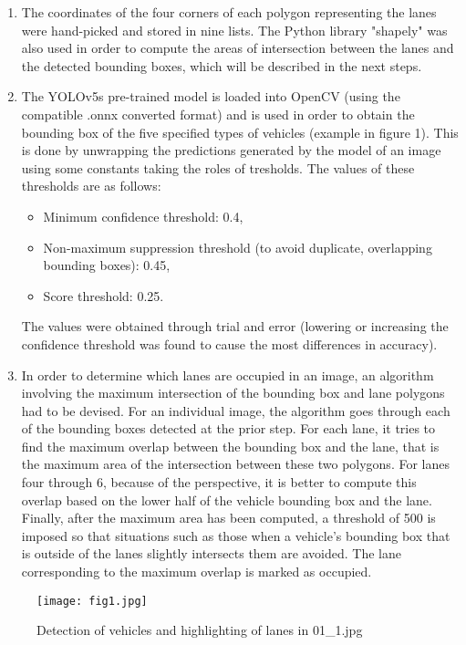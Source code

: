 \documentclass{article}
\begin{document}
\begin{enumerate}
	\item The coordinates of the four corners of each polygon representing the lanes were hand-picked and stored in nine lists. The Python library "shapely"\cite{shapely} was also used in order to compute the areas of intersection between the lanes and the detected bounding boxes, which will be described in the next steps.
	\item The YOLOv5s pre-trained model is loaded into OpenCV (using the compatible .onnx converted format) and is used in order to obtain the bounding box of the five specified types of vehicles (example in figure 1). This is done by unwrapping the predictions generated by the model of an image using some constants taking the roles of tresholds. The values of these thresholds are as follows: 
		\begin{itemize}
			\item Minimum confidence threshold: 0.4,
			\item Non-maximum suppression threshold (to avoid duplicate, overlapping bounding boxes): 0.45,
			\item Score threshold: 0.25.
		\end{itemize}
The values were obtained through trial and error (lowering or increasing the confidence threshold was found to cause the most differences in accuracy).
	\item In order to determine which lanes are occupied in an image, an algorithm involving the maximum intersection of the bounding box and lane polygons had to be devised. For an individual image, the algorithm goes through each of the bounding boxes detected at the prior step. For each lane, it tries to find the maximum overlap between the bounding box and the lane, that is the maximum area of the intersection between these two polygons. For lanes four through 6, because of the perspective, it is better to compute this overlap based on the lower half of the vehicle bounding box and the lane. Finally, after the maximum area has been computed, a threshold of 500 is imposed so that situations such as those when a vehicle's bounding box that is outside of the lanes slightly intersects them are avoided. The lane corresponding to the maximum overlap is marked as occupied.
\end{enumerate}

\begin{figure}[hbt!]
	\centering
	\texttt{[image: fig1.jpg]}
	\caption{Detection of vehicles and highlighting of lanes in 01\_1.jpg}
\end{figure}
\end{document}
